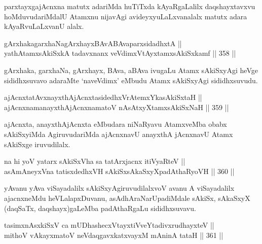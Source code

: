 \begin{artha}
parxtayxgajAcnxna matutx adariMda huTiTxda kAyaRgaLalilx
daqshayxtavxvu hoMduvudariMdalU Atamxnu nijavAgi avideyxyuLaLxvanalalx
matutx adara kAyaRvuLaLxvanU alalx.
\end{artha}

\begin{shl}
gArxhakagarxhaNagArxhayxBAvABAvaparxsidadhxtA || \\
yathA\s \s tamxsAkiSxkA tadavxnanx veVdimxVtAyxtamxsAkiSxkamf \hfill || 358 ||  
\end{shl}

\begin{artha}
gArxhaka, garxhaNa, gArxhayx, BAva, aBAva ivugaLu Atamx sAkiSxyAgi
heVge sididhxsuvavo adaraMte `naveVdimx' eMbudu Atamx sAkiSxyAgi
sididhxsuvudu.
\end{artha}

\begin{shl}
ajAcnxtatAvxnayxthAjAcnxtasidedhxVrAtemxYkasAkiSxtaH || \\
ajAcnxnamanayxthAjAcnxnamatoV nAsAtxyXtamxsAkiSxNaH \hfill || 359 ||  
\end{shl}

\begin{artha}
ajAcnxta, anayxthAjAcnxta eMbudara niNaRyavu AtamxveMba obabx\break
sAkiSxyiMda AgiruvudariMda ajAcnxnavU anayxthA jAcnxnavU Atamx
sAkiSxge iruvudilalx.
\end{artha}

\begin{shl}
na hi yoV yatarx sAkiSxVha sa tatArxjacnx itiVyaRteV || \\
asAmAneyxVna tatisxdedhxVH sAkiSxsAkaSxyXpadAthaRyoVH \hfill || 360 ||  
\end{shl}

\begin{artha}
yAvanu yAva viSayadalilx sAkiSxyAgiruvudilalxvoV avanu A viSayadalilx
ajacnxneMdu heVLalapxDuvanu, asAdhAraNarUpadiMdale sAkiSx, sAkaSxyX
(daqSaTx, daqshayx)gaLeMba padAthaRgaLu sididhxsuvavu.
\end{artha}


\begin{shl}
tasimxnAsxkiSxV ca mUDhashecxVtayxtiVveYtadivxrudhayxteV || \\
mithoV vAkayxmatoV neVdaqgavxkatxvayxM mAninA tataH \hfill || 361 ||  
\end{shl}

